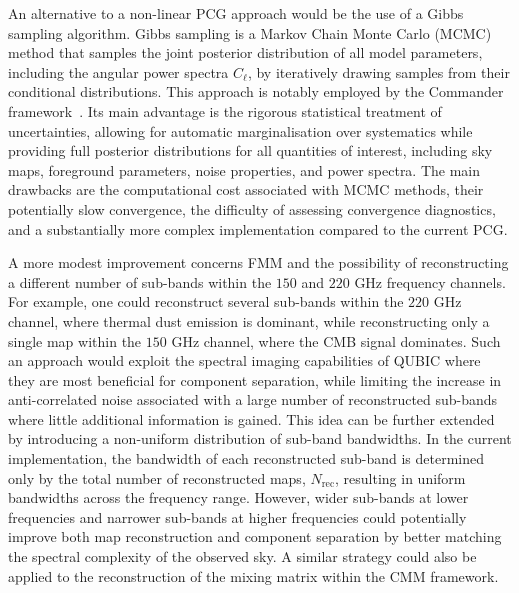 \documentclass[../../thesis.tex]{subfiles}
\begin{document}
An alternative to a non-linear PCG approach would be the use of a Gibbs sampling algorithm. Gibbs sampling is a Markov Chain Monte Carlo (MCMC) method that samples the joint posterior distribution of all model parameters, including the angular power spectra $C_\ell$, by iteratively drawing samples from their conditional distributions. This approach is notably employed by the Commander framework~\cite{Commander2008}. Its main advantage is the rigorous statistical treatment of uncertainties, allowing for automatic marginalisation over systematics while providing full posterior distributions for all quantities of interest, including sky maps, foreground parameters, noise properties, and power spectra. The main drawbacks are the computational cost associated with MCMC methods, their potentially slow convergence, the difficulty of assessing convergence diagnostics, and a substantially more complex implementation compared to the current PCG.

A more modest improvement concerns FMM and the possibility of reconstructing a different number of sub-bands within the $150$ and $220$ GHz frequency channels. For example, one could reconstruct several sub-bands within the $220$ GHz channel, where thermal dust emission is dominant, while reconstructing only a single map within the $150$ GHz channel, where the CMB signal dominates. Such an approach would exploit the spectral imaging capabilities of QUBIC where they are most beneficial for component separation, while limiting the increase in anti-correlated noise associated with a large number of reconstructed sub-bands where little additional information is gained.
This idea can be further extended by introducing a non-uniform distribution of sub-band bandwidths. In the current implementation, the bandwidth of each reconstructed sub-band is determined only by the total number of reconstructed maps, $N_{\text{rec}}$, resulting in uniform bandwidths across the frequency range. However, wider sub-bands at lower frequencies and narrower sub-bands at higher frequencies could potentially improve both map reconstruction and component separation by better matching the spectral complexity of the observed sky. A similar strategy could also be applied to the reconstruction of the mixing matrix within the CMM framework.
\end{document}
